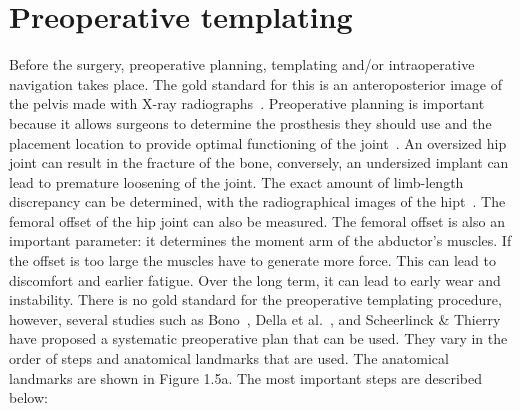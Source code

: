 \documentclass[whitelogo]{tudelft-report}
\begin{document}
{\section{Preoperative templating}
Before the surgery, preoperative planning, templating and/or intraoperative navigation takes place. The gold standard for this is an anteroposterior image of the pelvis made with X-ray radiographs~\cite{Pluot2009hip}. Preoperative planning is important because it allows surgeons to determine the prosthesis they should use and the placement location to provide optimal functioning of the joint~\cite{bono2004digital}. An oversized hip joint can result in the fracture of the bone, conversely, an undersized implant can lead to premature loosening of the joint. 
\forceindent The exact amount of limb-length discrepancy can be determined, with the radiographical images of the hipt~\cite{bono2004digital}. The femoral offset of the hip joint can also be measured. The femoral offset is also an important parameter: it determines the moment arm of the abductor's muscles. If the offset is too large the muscles have to generate more force. This can lead to discomfort and earlier fatigue. Over the long term, it can lead to early wear and instability. There is no gold standard for the preoperative templating procedure, however, several studies such as Bono~\cite{ bono2004digital}, Della et al.~\cite{della2005preoperative}, and Scheerlinck \& Thierry~\cite{scheerlinck2010primary} have proposed a systematic preoperative plan that can be used. They vary in the order of steps and anatomical landmarks that are used. The anatomical landmarks are shown in Figure 1.5a. The most important steps are described below:\par

}
\end{document}
